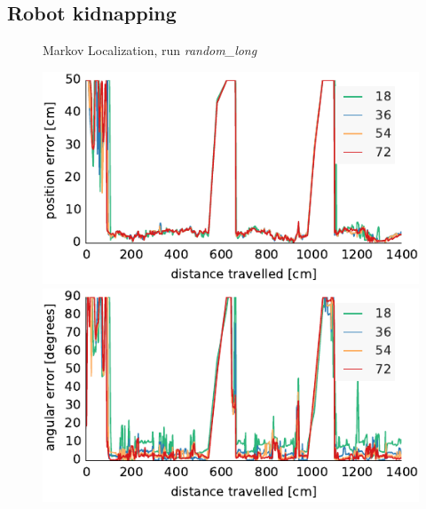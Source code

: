 \documentclass[letterpaper, 10pt, conference]{ieeeconf}
\begin{document}
\subsection{Robot kidnapping}

\begin{figure}

\begin{center}
Markov Localization, run \emph{random\_long}
\end{center}
\includegraphics{ml-whole_random_long-xy}\hfill
\includegraphics{ml-whole_random_long-theta}

\vspace{.5em}


\end{figure}
\end{document}

